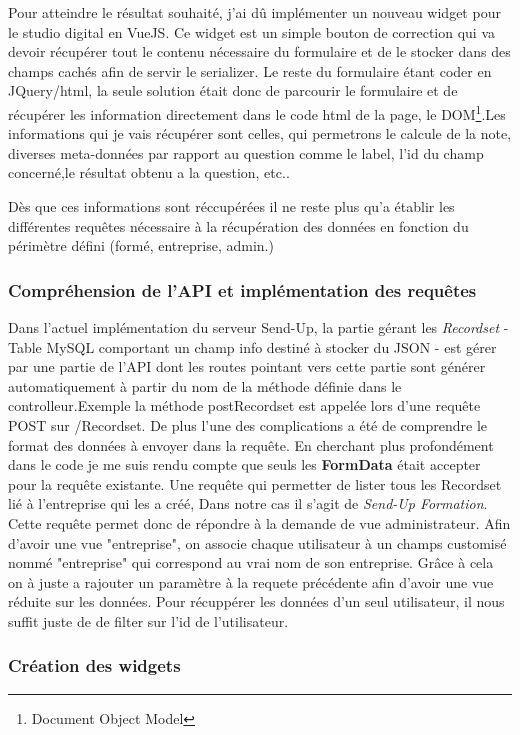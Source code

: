 Pour atteindre le résultat souhaité, j'ai dû implémenter un nouveau widget pour le studio digital en VueJS. Ce widget est un simple bouton de correction qui va devoir récupérer tout le contenu nécessaire du formulaire et de le stocker dans des champs cachés afin de servir le serializer. Le reste du formulaire étant coder en JQuery/html, la seule solution était donc de parcourir le formulaire et de récupérer les information directement dans le code html de la page, le DOM\footnote{Document Object Model}.Les informations qui je vais récupérer sont celles, qui permetrons le calcule de la note, diverses meta-données par rapport au question comme le label, l'id du champ concerné,le résultat obtenu a la question, etc.. 

Dès que ces informations sont réccupérées il ne reste plus qu'a établir les différentes requêtes nécessaire à la récupération des données en fonction du périmètre défini (formé, entreprise, admin.)


\subsubsection{Compréhension de l'API et implémentation des requêtes}

Dans l'actuel implémentation du serveur Send-Up, la partie gérant les \textit{Recordset} - Table MySQL comportant un champ info destiné à stocker du JSON - est gérer par une partie de l'API dont les routes pointant vers cette partie sont générer automatiquement à partir du nom de la méthode définie dans le controlleur.Exemple la méthode postRecordset est appelée lors d'une requête POST sur /Recordset. De plus l'une des complications a été de comprendre le format des données à envoyer dans la requête. En cherchant plus profondément dans le code je me suis rendu compte que seuls les \textbf{FormData} était accepter pour la requête existante.
Une requête qui permetter de lister tous les Recordset lié à l'entreprise qui les a créé, Dans notre cas il s'agit de \textit{Send-Up Formation}. Cette requête permet donc de répondre à la demande de vue administrateur. Afin d'avoir une vue "entreprise", on associe chaque utilisateur à  un champs customisé nommé "entreprise" qui correspond au vrai nom de son entreprise. Grâce à cela on à juste a rajouter un paramètre à la requete précédente afin d'avoir une vue réduite sur les données. 
Pour récuppérer les données d'un seul utilisateur, il nous suffit juste de de filter sur l'id de l'utilisateur.   

\subsubsection{Création des widgets}

